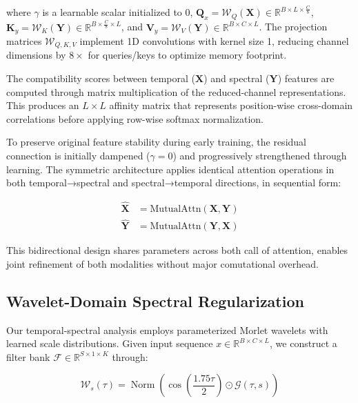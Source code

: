 \documentclass[10pt, conference]{IEEEtran}
\begin{document}
where $\gamma$ is a learnable scalar initialized to 0, $\mathbf{Q}_x = \mathcal{W}_Q(\mathbf{X}) \in \mathbb{R}^{B \times L \times \frac{C}{8}}$, $\mathbf{K}_y = \mathcal{W}_K(\mathbf{Y}) \in \mathbb{R}^{B \times \frac{C}{8} \times L}$, and $\mathbf{V}_y = \mathcal{W}_V(\mathbf{Y}) \in \mathbb{R}^{B \times C \times L}$. The projection matrices $\mathcal{W}_{Q,K,V}$ implement 1D convolutions with kernel size 1, reducing channel dimensions by $8\times$ for queries/keys to optimize memory footprint.

The compatibility scores between temporal ($\mathbf{X}$) and spectral ($\mathbf{Y}$) features are computed through matrix multiplication of the reduced-channel representations. This produces an $L \times L$ affinity matrix that represents position-wise cross-domain correlations before applying row-wise softmax normalization.

To preserve original feature stability during early training, the residual connection is initially dampened ($\gamma=0$) and progressively strengthened through learning. The symmetric architecture applies identical attention operations in both temporal→spectral and spectral→temporal directions, in sequential form:

\begin{equation}
    \begin{aligned}
        \mathbf{\widehat{X}} & = \text{MutualAttn}(\mathbf{X}, \mathbf{Y}) \\
        \mathbf{\widehat{Y}} & = \text{MutualAttn}(\mathbf{Y}, \mathbf{X})
    \end{aligned}
\end{equation}

This bidirectional design shares parameters across both call of attention, enables joint refinement of both modalities without major comutational overhead.

\subsection{Wavelet-Domain Spectral Regularization}
\label{subsec:wavelet}

Our temporal-spectral analysis employs parameterized Morlet wavelets with learned scale distributions. Given input sequence $x \in \mathbb{R}^{B \times C \times L}$, we construct a filter bank $\mathcal{F} \in \mathbb{R}^{S \times 1 \times K}$ through:

\begin{equation}
    \mathcal{W}_s(\tau) = \operatorname{Norm} \left(\cos(\frac{1.75\tau}{2}) \odot \mathcal{G}(\tau,s)\right)
\end{equation}
\end{document}
